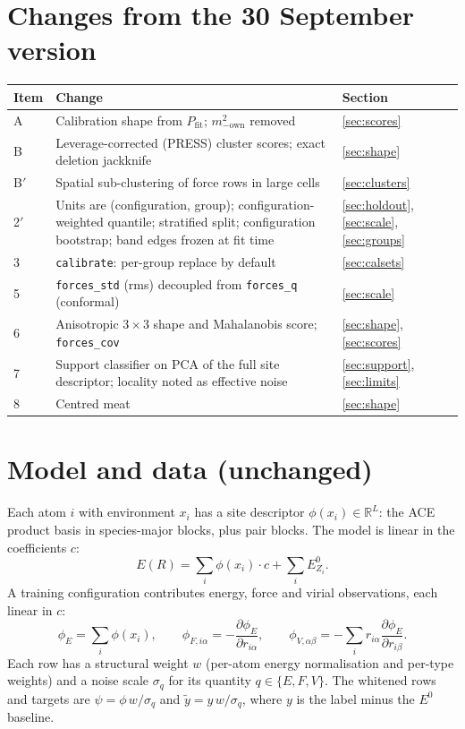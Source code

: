 \documentclass[11pt,a4paper]{article}
\newcommand{\R}{\mathbb{R}}
\newcommand{\code}[1]{\texttt{#1}}
\begin{document}
\section*{Changes from the 30 September version}
\begin{center}
\begin{tabular}{@{}lp{}l@{}}
\toprule
Item & Change & Section \\
\midrule
A & Calibration shape from $P_{\mathrm{fit}}$; $m^2_{-\mathrm{own}}$ removed & \ref{sec:scores} \\
B & Leverage-corrected (PRESS) cluster scores; exact deletion jackknife & \ref{sec:shape} \\
B$'$ & Spatial sub-clustering of force rows in large cells & \ref{sec:clusters} \\
2$'$ & Units are (configuration, group); configuration-weighted quantile; stratified split; configuration bootstrap; band edges frozen at fit time & \ref{sec:holdout}, \ref{sec:scale}, \ref{sec:groups} \\
3 & \code{calibrate}: per-group replace by default & \ref{sec:calsets} \\
5 & \code{forces\_std} (rms) decoupled from \code{forces\_q} (conformal) & \ref{sec:scale} \\
6 & Anisotropic $3\times3$ shape and Mahalanobis score; \code{forces\_cov} & \ref{sec:shape}, \ref{sec:scores} \\
7 & Support classifier on PCA of the full site descriptor; locality noted as effective noise & \ref{sec:support}, \ref{sec:limits} \\
8 & Centred meat & \ref{sec:shape} \\
\bottomrule
\end{tabular}
\end{center}

\tableofcontents

\section{Model and data (unchanged)}

Each atom $i$ with environment $x_i$ has a site descriptor $\phi(x_i)\in\R^L$: the ACE product basis
in species-major blocks, plus pair blocks. The model is linear in the coefficients $c$:
\begin{equation}
E(R) = \sum_i \phi(x_i)\cdot c + \sum_i E^0_{Z_i}.
\end{equation}
A training configuration contributes energy, force and virial observations, each linear in $c$:
\begin{equation}
\phi_E = \sum_i \phi(x_i),\qquad
\phi_{F,i\alpha} = -\frac{\partial \phi_E}{\partial r_{i\alpha}},\qquad
\phi_{V,\alpha\beta} = -\sum_i r_{i\alpha}\frac{\partial\phi_E}{\partial r_{i\beta}}.
\end{equation}
Each row has a structural weight $w$ (per-atom energy normalisation and per-type weights) and a
noise scale $\sigma_q$ for its quantity $q\in\{E,F,V\}$. The whitened rows and targets are
$\psi=\phi\,w/\sigma_q$ and $\tilde y = y\,w/\sigma_q$, where $y$ is the label minus the $E^0$
baseline.
\end{document}
